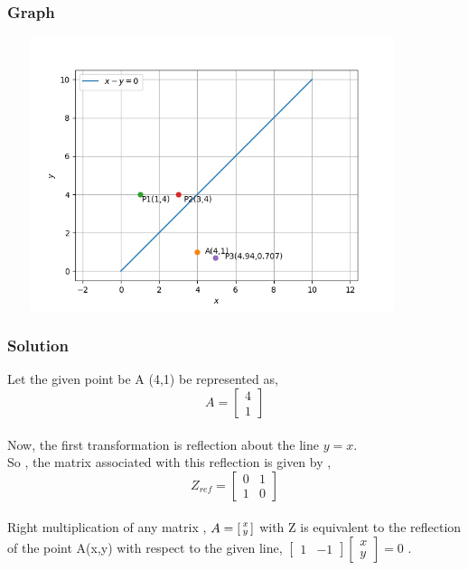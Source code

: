 \documentclass{beamer}
\begin{document}
\begin{frame}
\frametitle{Graph}
\includegraphics[height=8cm , width=12cm]{line}
\end{frame}
\begin{frame}
\frametitle{Solution}
Let the given point be A (4,1) be represented as,  \[A = \begin{bmatrix} 4\\ 1 

\end{bmatrix}\] \\
 Now, the first transformation is reflection about the line $y = x$.\\
 So , the matrix associated with this reflection is given by ,\\
 \[Z_{ref} =\begin{bmatrix} 0 & 1 \\ 1 & 0  \end{bmatrix}\] \\ Right multiplication of any matrix ,
 $A= \begin{bsmallmatrix} x\\y \end{bsmallmatrix}$ with Z is equivalent \break to the reflection of the point A(x,y) with respect to the given line,  $\begin{bmatrix} 1 & -1 \end{bmatrix} \begin{bmatrix} x \\y \end{bmatrix}  = 0 $ .
\end{frame}

\end{document}
